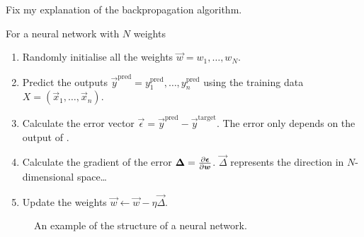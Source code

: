 \begin{todo}
	Fix my explanation of the backpropagation algorithm.

For a neural network with \(N\) weights
\begin{enumerate}
	\item Randomly initialise all the weights \(\vec{w} = w_1, \dots, w_N\).
	\item Predict the outputs \(\vec{y}^\text{pred} = y^\text{pred}_1, \dots, y^\text{pred}_n\) using the training data \(X = (\vec{x}_1, \dots, \vec{x}_n)\).
	\item Calculate the error vector \(\vec{\epsilon} = \vec{y}^\text{pred} - \vec{y}^\text{target}\). The error only depends on the output of .
	\item Calculate the gradient of the error \(\bm{\Delta} = \pdv{\bm{\epsilon}}{\bm{w}}\). \(\vec{\Delta}\) represents the direction in \(N\)-dimensional space\dots 
	\item Update the weights \(\vec{w} \leftarrow \vec{w} - \eta \vec{\Delta}\).
\end{enumerate}
\end{todo}

\begin{figure}[htbp]
	\centering
	
	\caption{An example of the structure of a neural network.}
	\label{fig:neural-network-example}
\end{figure}


